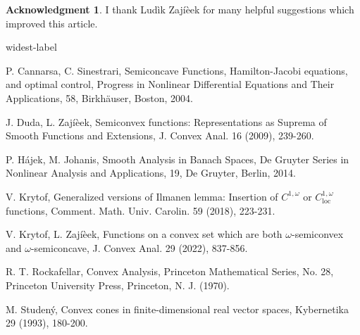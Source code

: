 \documentclass[10pt,a4paper]{amsart}
\theoremstyle{definition}
\newtheorem*{acknowledgment}{Acknowledgment}
\newcommand{\loc}{\operatorname{loc}}
\begin{document}
\begin{acknowledgment}
I thank Ludìk Zajíèek for many helpful suggestions which improved this article.
\end{acknowledgment}

\begin{thebibliography}{widest-label}

 P. Cannarsa, C. Sinestrari, Semiconcave Functions, Hamilton-Jacobi equations, and optimal control, Progress in Nonlinear Differential Equations and Their Applications, 58, Birkhäuser, Boston, 2004.

 J. Duda, L. Zajíèek, Semiconvex functions: Representations as Suprema of Smooth Functions and Extensions, J. Convex Anal. 16 (2009), 239-260.

 P. Hájek, M. Johanis, Smooth Analysis in Banach Spaces, De Gruyter Series in Nonlinear Analysis and Applications, 19, De Gruyter, Berlin, 2014.

 V. Krytof, Generalized versions of Ilmanen lemma: Insertion of $ C^{1,\omega} $ or $ C^{1,\omega}_{\loc} $ functions, Comment. Math. Univ. Carolin. 59 (2018), 223-231.

 V. Krytof, L. Zajíèek, Functions on a convex set which are both $ \omega $-semiconvex and $ \omega $-semiconcave, J. Convex Anal. 29 (2022), 837-856.

 R. T. Rockafellar, Convex Analysis, Princeton Mathematical Series, No. 28, Princeton University Press, Princeton, N. J. (1970).

 M. Studený, Convex cones in finite-dimensional real vector spaces, Kybernetika 29 (1993), 180-200.

\end{thebibliography}
\end{document}
